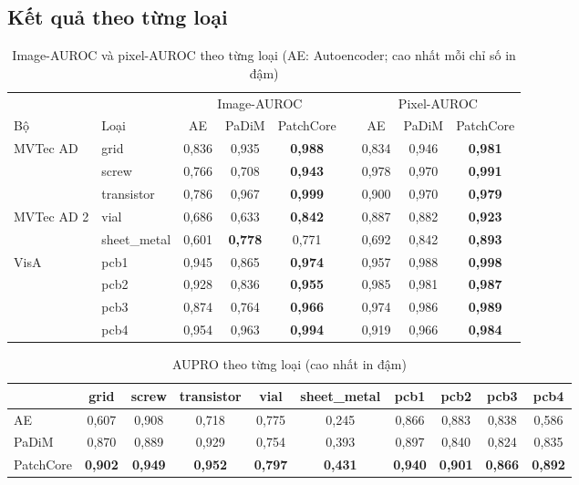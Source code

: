\subsection{Kết quả theo từng loại}

\begin{table}[htbp]
  \centering
  \caption[Image-AUROC và pixel-AUROC theo từng loại]{Image-AUROC và pixel-AUROC theo từng loại (AE: Autoencoder; cao nhất mỗi chỉ số in đậm)}
  \label{tab:per-category}
  \small
  \begin{tabular}{@{}llccccccc@{}}
    \toprule
    & & \multicolumn{3}{c}{Image-AUROC} && \multicolumn{3}{c}{Pixel-AUROC} \\
    \cmidrule{3-5}\cmidrule{7-9}
    Bộ & Loại & AE & PaDiM & PatchCore && AE & PaDiM & PatchCore \\
    \midrule
    MVTec AD   & grid        & 0,836 & 0,935 & \textbf{0,988} && 0,834 & 0,946 & \textbf{0,981} \\
               & screw       & 0,766 & 0,708 & \textbf{0,943} && 0,978 & 0,970 & \textbf{0,991} \\
               & transistor  & 0,786 & 0,967 & \textbf{0,999} && 0,900 & 0,970 & \textbf{0,979} \\
    \midrule
    MVTec AD 2 & vial        & 0,686 & 0,633 & \textbf{0,842} && 0,887 & 0,882 & \textbf{0,923} \\
               & sheet\_metal & 0,601 & \textbf{0,778} & 0,771 && 0,692 & 0,842 & \textbf{0,893} \\
    \midrule
    VisA       & pcb1        & 0,945 & 0,865 & \textbf{0,974} && 0,957 & 0,988 & \textbf{0,998} \\
               & pcb2        & 0,928 & 0,836 & \textbf{0,955} && 0,985 & 0,981 & \textbf{0,987} \\
               & pcb3        & 0,874 & 0,764 & \textbf{0,966} && 0,974 & 0,986 & \textbf{0,989} \\
               & pcb4        & 0,954 & 0,963 & \textbf{0,994} && 0,919 & 0,966 & \textbf{0,984} \\
    \bottomrule
  \end{tabular}
\end{table}

\begin{table}[htbp]
  \centering
  \caption{AUPRO theo từng loại (cao nhất in đậm)}
  \label{tab:aupro}
  \small
  \begin{tabular}{@{}lccccccccc@{}}
    \toprule
    & grid & screw & transistor & vial & sheet\_metal & pcb1 & pcb2 & pcb3 & pcb4 \\
    \midrule
    AE        & 0,607 & 0,908 & 0,718 & 0,775 & 0,245 & 0,866 & 0,883 & 0,838 & 0,586 \\
    PaDiM     & 0,870 & 0,889 & 0,929 & 0,754 & 0,393 & 0,897 & 0,840 & 0,824 & 0,835 \\
    PatchCore & \textbf{0,902} & \textbf{0,949} & \textbf{0,952} & \textbf{0,797} & \textbf{0,431} & \textbf{0,940}
              & \textbf{0,901} & \textbf{0,866} & \textbf{0,892} \\
    \bottomrule
  \end{tabular}
\end{table}

